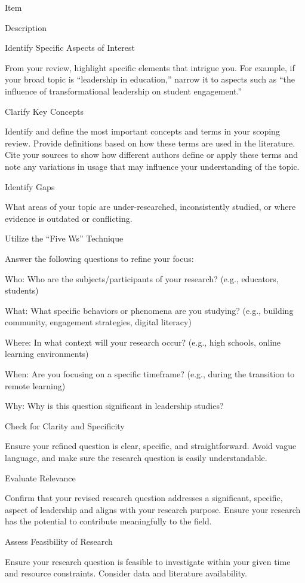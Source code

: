 \documentclass[
  letterpaper,
  DIV=11,
  numbers=noendperiod]{scrreprt}
\begin{document}
Item

Description

Identify Specific Aspects of Interest

From your review, highlight specific elements that intrigue you. For
example, if your broad topic is ``leadership in education,'' narrow it
to aspects such as ``the influence of transformational leadership on
student engagement.''

Clarify Key Concepts

Identify and define the most important concepts and terms in your
scoping review. Provide definitions based on how these terms are used in
the literature. Cite your sources to show how different authors define
or apply these terms and note any variations in usage that may influence
your understanding of the topic.

Identify Gaps

What areas of your topic are under-researched, inconsistently studied,
or where evidence is outdated or conflicting.

Utilize the ``Five Ws'' Technique

Answer the following questions to refine your focus:

Who: Who are the subjects/participants of your research? (e.g.,
educators, students)

What: What specific behaviors or phenomena are you studying? (e.g.,
building community, engagement strategies, digital literacy)

Where: In what context will your research occur? (e.g., high schools,
online learning environments)

When: Are you focusing on a specific timeframe? (e.g., during the
transition to remote learning)

Why: Why is this question significant in leadership studies?

Check for Clarity and Specificity

Ensure your refined question is clear, specific, and straightforward.
Avoid vague language, and make sure the research question is easily
understandable.

Evaluate Relevance

Confirm that your revised research question addresses a significant,
specific, aspect of leadership and aligns with your research purpose.
Ensure your research has the potential to contribute meaningfully to the
field.

Assess Feasibility of Research

Ensure your research question is feasible to investigate within your
given time and resource constraints. Consider data and literature
availability.
\end{document}
